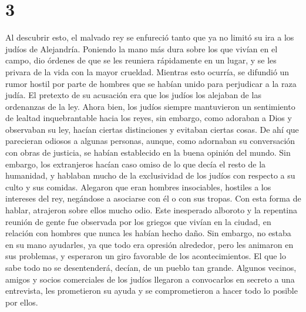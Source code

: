 \hypertarget{section-2}{%
\section{3}\label{section-2}}

 Al descubrir esto, el malvado rey se enfureció tanto que
ya no limitó su ira a los judíos de Alejandría. Poniendo la mano más
dura sobre los que vivían en el campo, dio órdenes de que se les
reuniera rápidamente en un lugar, y se les privara de la vida con la
mayor crueldad.  Mientras esto ocurría, se difundió un
rumor hostil por parte de hombres que se habían unido para perjudicar a
la raza judía. El pretexto de su acusación era que los judíos los
alejaban de las ordenanzas de la ley.  Ahora bien, los
judíos siempre mantuvieron un sentimiento de lealtad inquebrantable
hacia los reyes,  sin embargo, como adoraban a Dios y
observaban su ley, hacían ciertas distinciones y evitaban ciertas cosas.
De ahí que parecieran odiosos a algunas personas,  aunque,
como adornaban su conversación con obras de justicia, se habían
establecido en la buena opinión del mundo.  Sin embargo,
los extranjeros hacían caso omiso de lo que decía el resto de la
humanidad,  y hablaban mucho de la exclusividad de los
judíos con respecto a su culto y sus comidas. Alegaron que eran hombres
insociables, hostiles a los intereses del rey, negándose a asociarse con
él o con sus tropas. Con esta forma de hablar, atrajeron sobre ellos
mucho odio.  Este inesperado alboroto y la repentina
reunión de gente fue observada por los griegos que vivían en la ciudad,
en relación con hombres que nunca les habían hecho daño. Sin embargo, no
estaba en su mano ayudarles, ya que todo era opresión alrededor, pero
les animaron en sus problemas, y esperaron un giro favorable de los
acontecimientos.  El que lo sabe todo no se desentenderá,
decían, de un pueblo tan grande.  Algunos vecinos, amigos
y socios comerciales de los judíos llegaron a convocarlos en secreto a
una entrevista, les prometieron su ayuda y se comprometieron a hacer
todo lo posible por ellos.

